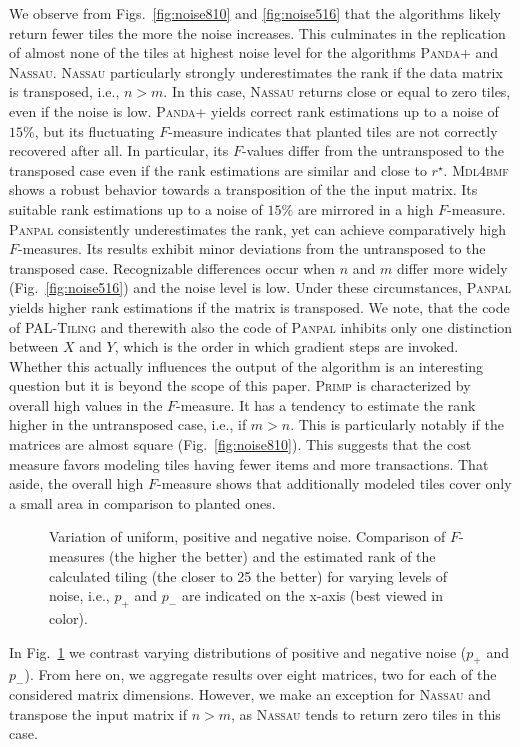 We observe from Figs.~\ref{fig:noise810} and \ref{fig:noise516} that the algorithms likely return fewer tiles the more the noise increases. This culminates in the replication of almost none of the tiles at highest noise level for the algorithms \textsc{Panda+} and \textsc{Nassau}. \textsc{Nassau} particularly strongly underestimates the rank if the data matrix is transposed, i.e., $n>m$. In this case, \textsc{Nassau} returns close or equal to zero tiles, even if the noise is low. \textsc{Panda+} yields correct rank estimations up to a noise of $15\%$, but its fluctuating $F$-measure indicates that planted tiles are not correctly recovered after all. In particular, its $F$-values  differ from the untransposed to the transposed case even if the rank estimations are similar and close to $r^\star$. \textsc{Mdl4bmf} shows a robust behavior towards a transposition of the the input matrix. Its suitable rank estimations up to a noise of $15\%$ are mirrored in a high $F$-measure. \textsc{Panpal} consistently underestimates the rank, yet can achieve comparatively high $F$-measures. Its results exhibit minor deviations from the untransposed to the transposed case. Recognizable differences occur when $n$ and $m$ differ more widely (Fig.~\ref{fig:noise516}) and the noise level is low. Under these circumstances, \textsc{Panpal} yields  higher rank estimations if the matrix is transposed. We note, that  the code of \textsc{PAL-Tiling} and therewith also the code of \textsc{Panpal} inhibits only one distinction between  $X$ and $Y$, which is the order in which gradient steps are invoked. Whether this actually influences the output of the algorithm is an interesting question but it is beyond the scope of this paper.
\textsc{Primp} is characterized by overall high values in the $F$-measure. It has a tendency to estimate the rank higher in the untransposed case, i.e., if $m>n$. This is particularly notably if the  matrices are almost square (Fig.~\ref{fig:noise810}). This suggests that the cost measure favors modeling tiles having fewer items and more transactions. That aside, the overall high $F$-measure shows that additionally modeled tiles cover only a small area in comparison to planted ones. 

\begin{figure}
\centering

\caption{Variation of uniform, positive and negative noise. Comparison of $F$-measures (the higher the better) and the estimated rank of the calculated tiling (the closer to 25 the better) for varying levels of noise, i.e., $p_+$ and $p_-$ are indicated on the x-axis (best viewed in color).}
\label{fig:noise}
\end{figure}
In Fig.~\ref{fig:noise} we contrast varying distributions of positive and negative noise ($p_+$ and $p_-$). From here on, we aggregate results over eight matrices, two for each of the considered matrix dimensions. However, we make an exception for \textsc{Nassau} and transpose the input matrix if $n>m$, as \textsc{Nassau} tends to return zero tiles in this case.


